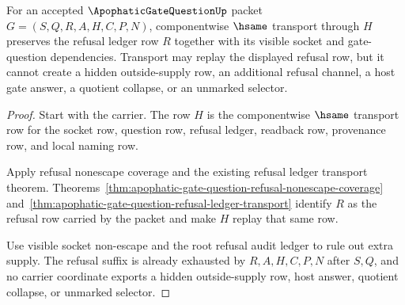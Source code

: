 \begin{theorem}
\label{thm:apophatic-gate-question-refusal-row-transport}
For an accepted $\ApophaticGateQuestionUp$ packet $G=(S,Q,R,A,H,C,P,N)$, componentwise $\hsame$ transport through $H$ preserves the refusal ledger row $R$ together with its visible socket and gate-question dependencies. Transport may replay the displayed refusal row, but it cannot create a hidden outside-supply row, an additional refusal channel, a host gate answer, a quotient collapse, or an unmarked selector.
\end{theorem}
\begin{proof}
Start with the carrier. The row $H$ is the componentwise $\hsame$ transport row for the socket row, question row, refusal ledger, readback row, provenance row, and local naming row.

Apply refusal nonescape coverage and the existing refusal ledger transport theorem. Theorems~\ref{thm:apophatic-gate-question-refusal-nonescape-coverage} and~\ref{thm:apophatic-gate-question-refusal-ledger-transport} identify $R$ as the refusal row carried by the packet and make $H$ replay that same row.

Use visible socket non-escape and the root refusal audit ledger to rule out extra supply. The refusal suffix is already exhausted by $R,A,H,C,P,N$ after $S,Q$, and no carrier coordinate exports a hidden outside-supply row, host answer, quotient collapse, or unmarked selector.
\end{proof}

